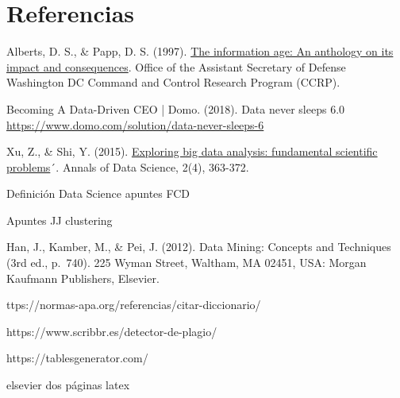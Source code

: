 \documentclass[3p,twocolumn]{elsarticle}
\begin{document}
\section{Referencias}
\renewcommand{\section}[2]{}
\begin{thebibliography}{X}

 Alberts, D. S., \& Papp, D. S. (1997). \href{http://www.dodccrp.org/files/Alberts_Anthology_I.pdf} {The information age: An anthology on its impact and consequences}. Office of the Assistant Secretary of Defense Washington DC Command and Control Research Program (CCRP).

 Becoming A Data-Driven CEO | Domo. (2018). Data never sleeps 6.0 \href{https://www.domo.com/solution/data-never-sleeps-6} {https://www.domo.com/solution/data-never-sleeps-6}

 Xu, Z., \& Shi, Y. (2015). \href {https://link.springer.com/content/pdf/10.1007/s40745-015-0063-7.pdf} {Exploring big data analysis: fundamental scientific problems}´. Annals of Data Science, 2(4), 363-372.

 Definición Data Science apuntes FCD

 Apuntes JJ clustering



Han, J., Kamber, M., \& Pei, J. (2012). Data Mining: Concepts and
Techniques (3rd ed., p.~740). 225 Wyman Street, Waltham, MA 02451, USA:
Morgan Kaufmann Publishers, Elsevier.

\end{thebibliography}

\section{Ayuda}

https://normas-apa.org/referencias/citar-diccionario/

https://www.scribbr.es/detector-de-plagio/

https://tablesgenerator.com/

elsevier dos páginas latex
\end{document}

